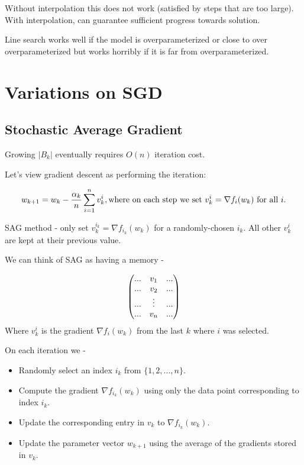 \documentclass[
]{article}
\begin{document}
Without interpolation this does not work (satisfied by steps that are too large). With interpolation, can guarantee sufficient progress towards solution.

Line search works well if the model is overparameterized or close to over overparameterized but works horribly if it is far from overparameterized.

\section{Variations on SGD}\label{variations-on-sgd}

\subsection{Stochastic Average Gradient}\label{stochastic-average-gradient}

Growing \(|B_k|\) eventually requires \(O(n)\) iteration cost.

Let's view gradient descent as performing the iteration:

\[
w_{k+1} = w_k - \frac{\alpha_k}{n} \sum_{i=1}^n v_k^i, \\
\text{where on each step we set } v_k^i = \nabla f_i(w_k) \text{ for all } i. \\
\]

SAG method - only set \(v_k^{i_k} = \nabla f_{i_k}(w_k)\) for a randomly-chosen \(i_k\). All other \(v_k^i\) are kept at their previous value.

We can think of SAG as having a memory -

\[
\text{} \\
\begin{pmatrix}
...& v_1 &...\\
...& v_2 &...\\
...& \vdots &... \\
...& v_n &...
\end{pmatrix} \\
\]
Where \(v_k^i\) is the gradient \(\nabla f_i(w_k)\) from the last \(k\) where \(i\) was selected.

On each iteration we -

\begin{itemize}
\item
  Randomly select an index \(i_k\) from \(\{1, 2, ..., n\}\).
\item
  Compute the gradient \(\nabla f_{i_k}(w_k)\) using only the data point corresponding to index \(i_k\).
\item
  Update the corresponding entry in \(v_k\) to \(\nabla f_{i_k}(w_k)\).
\item
  Update the parameter vector \(w_{k+1}\) using the average of the gradients stored in \(v_k\).
\end{itemize}
\end{document}
